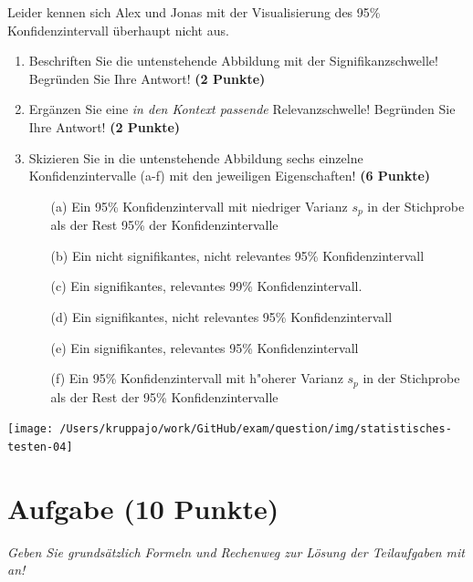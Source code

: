 \documentclass[a4paper, 9pt]{scrartcl}\usepackage[]{graphicx}\usepackage[]{xcolor}
\begin{document}
\vspace{1ex}

Leider kennen sich Alex und Jonas mit der Visualisierung des 95\% Konfidenzintervall überhaupt nicht aus. 

\begin{enumerate}
\item Beschriften Sie die untenstehende Abbildung mit der Signifikanzschwelle! Begründen Sie Ihre Antwort! \textbf{(2 Punkte)}
\item Ergänzen Sie eine \textit{in den Kontext passende} Relevanzschwelle! Begründen Sie Ihre Antwort! \textbf{(2 Punkte)} 
\item Skizieren Sie in die untenstehende Abbildung sechs einzelne Konfidenzintervalle (a-f) mit den
  jeweiligen Eigenschaften! \textbf{(6 Punkte)}
  \begin{itemize}
  \item[(a)] Ein 95\% Konfidenzintervall mit niedriger Varianz $s_p$ in der Stichprobe als der Rest 95\% der Konfidenzintervalle 	
  \item[(b)] Ein nicht signifikantes, nicht relevantes 95\% Konfidenzintervall 	
  \item[(c)] Ein signifikantes, relevantes 99\% Konfidenzintervall. 	
  \item[(d)] Ein signifikantes, nicht relevantes 95\% Konfidenzintervall 
  \item[(e)] Ein signifikantes, relevantes 95\% Konfidenzintervall
  \item[(f)] Ein 95\% Konfidenzintervall mit h{"o}herer Varianz $s_p$ in der Stichprobe als der Rest der 95\% Konfidenzintervalle
  \end{itemize}
\end{enumerate}

\begin{center}
  \texttt{[image: /Users/kruppajo/work/GitHub/exam/question/img/statistisches-testen-04]}
\end{center}


 
\clearpage

\section{Aufgabe \hfill (10 Punkte)}

\textit{Geben Sie grundsätzlich Formeln und Rechenweg zur Lösung der Teilaufgaben mit an!} \\[1Ex]
\end{document}
